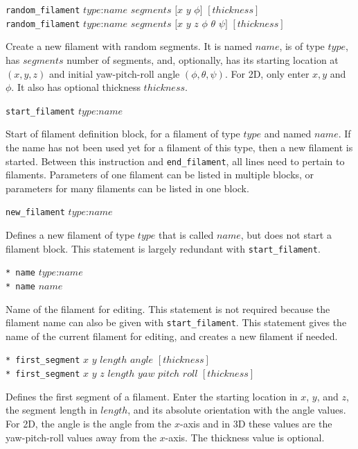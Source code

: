 \documentclass {scrbook}
\newcommand {\ttt} {\texttt}
\begin{document}
\begin{description}

\item{\ttt{random\_filament} $type$:$name$ $segments$ $[x$ $y$ $\phi]$ $[thickness]$}\\
\ttt{random\_filament} $type$:$name$ $segments$ $[x$ $y$ $z$ $\phi$ $\theta$ $\psi]$ $[thickness]$

Create a new filament with random segments. It is named $name$, is of type $type$, has $segments$ number of segments, and, optionally, has its starting location at $(x,y,z)$ and initial yaw-pitch-roll angle $(\phi, \theta, \psi)$. For 2D, only enter $x,y$ and $\phi$. It also has optional thickness $thickness$.

\item{\ttt{start\_filament} $type$:$name$}

Start of filament definition block, for a filament of type $type$ and named $name$. If the name has not been used yet for a filament of this type, then a new filament is started. Between this instruction and \ttt{end\_filament}, all lines need to pertain to filaments. Parameters of one filament can be listed in multiple blocks, or parameters for many filaments can be listed in one block.

\item{\ttt{new\_filament} $type$:$name$}

Defines a new filament of type $type$ that is called $name$, but does not start a filament block. This statement is largely redundant with \ttt{start\_filament}.

\item{\ttt{* name} $type$:$name$} \\
\ttt{* name} $name$

Name of the filament for editing. This statement is not required because the filament name can also be given with \ttt{start\_filament}. This statement gives the name of the current filament for editing, and creates a new filament if needed.

\item{\ttt{* first\_segment} $x$ $y$ $length$ $angle$ $[thickness]$\\
\ttt{* first\_segment} $x$ $y$ $z$ $length$ $yaw$ $pitch$ $roll$ $[thickness]$}

Defines the first segment of a filament. Enter the starting location in $x$, $y$, and $z$, the segment length in $length$, and its absolute orientation with the angle values. For 2D, the angle is the angle from the $x$-axis and in 3D these values are the yaw-pitch-roll values away from the $x$-axis. The thickness value is optional.


\end{description}
\end{document}
